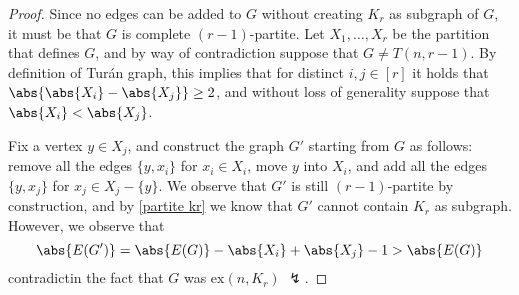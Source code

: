 \documentclass[a4paper, 12pt]{report}
\begin{document}
    \begin{proof}
        Since no edges can be added to $G$ without creating $K_r$ as subgraph of $G$, it must be that $G$ is complete $(r - 1)$-partite. Let $X_1, \ldots, X_r$ be the partition that defines $G$, and by way of contradiction suppose that $G \neq T(n, r - 1)$. By definition of Turán graph, this implies that for distinct $i, j \in [r]$ it holds that $\abs{\abs{X_i} - \abs{X_j}} \ge 2$, and without loss of generality suppose that $\abs{X_i} < \abs{X_j}$.

        Fix a vertex $y \in X_j$, and construct the graph $G'$ starting from $G$ as follows: remove all the edges $\{y, x_i\}$ for $x_i \in X_i$, move $y$ into $X_i$, and add all the edges $\{y, x_j\}$ for $x_j \in X_j - \{y\}$. We observe that $G'$ is still $(r- 1)$-partite by construction, and by \cref{partite kr} we know that $G'$ cannot contain $K_r$ as subgraph. However, we observe that $$\abs{E(G')} = \abs{E(G)} - \abs{X_i} + \abs{X_j} - 1 > \abs{E(G)}$$ contradictin the fact that $G$ was $\mathrm{ex}(n, K_r)$ $\lightning$.
    \end{proof}

    \printbibliography %
\end{document}

